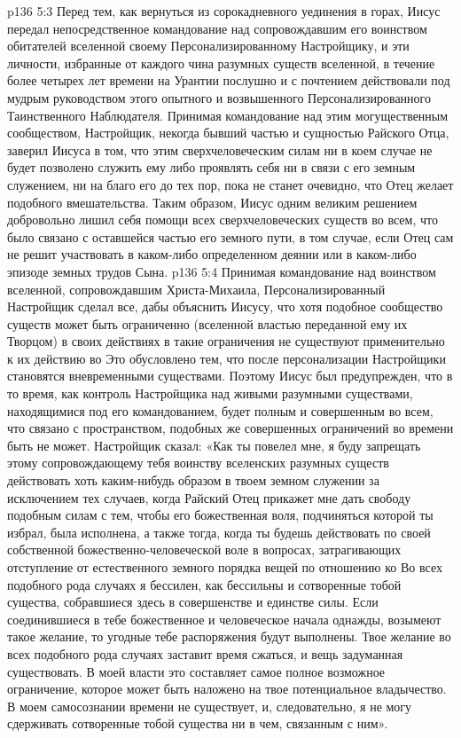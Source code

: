 \vs p136 5:3 \pc Перед тем, как вернуться из сорокадневного уединения в горах, Иисус передал непосредственное командование над сопровождавшим его воинством обитателей вселенной своему Персонализированному Настройщику, и эти личности, избранные от каждого чина разумных существ вселенной, в течение более четырех лет времени на Урантии послушно и с почтением действовали под мудрым руководством этого опытного и возвышенного Персонализированного Таинственного Наблюдателя. Принимая командование над этим могущественным сообществом, Настройщик, некогда бывший частью и сущностью Райского Отца, заверил Иисуса в том, что этим сверхчеловеческим силам ни в коем случае не будет позволено служить ему либо проявлять себя ни в связи с его земным служением, ни на благо его до тех пор, пока не станет очевидно, что Отец желает подобного вмешательства. Таким образом, Иисус одним великим решением добровольно лишил себя помощи всех сверхчеловеческих существ во всем, что было связано с оставшейся частью его земного пути, в том случае, если Отец сам не решит участвовать в каком\hyp{}либо определенном деянии или в каком\hyp{}либо эпизоде земных трудов Сына.
\vs p136 5:4 Принимая командование над воинством вселенной, сопровождавшим Христа\hyp{}Михаила, Персонализированный Настройщик сделал все, дабы объяснить Иисусу, что хотя подобное сообщество существ может быть ограниченно (вселенной властью переданной ему их Творцом) в своих действиях в  такие ограничения не существуют применительно к их действию во  Это обусловлено тем, что после персонализации Настройщики становятся вневременными существами. Поэтому Иисус был предупрежден, что в то время, как контроль Настройщика над живыми разумными существами, находящимися под его командованием, будет полным и совершенным во всем, что связано с пространством, подобных же совершенных ограничений во времени быть не может. Настройщик сказал: «Как ты повелел мне, я буду запрещать этому сопровождающему тебя воинству вселенских разумных существ действовать хоть каким\hyp{}нибудь образом в твоем земном служении за исключением тех случаев, когда Райский Отец прикажет мне дать свободу подобным силам с тем, чтобы его божественная воля, подчиняться которой ты избрал, была исполнена, а также тогда, когда ты будешь действовать по своей собственной божественно\hyp{}человеческой воле в вопросах, затрагивающих отступление от естественного земного порядка вещей по отношению ко  Во всех подобного рода случаях я бессилен, как бессильны и сотворенные тобой существа, собравшиеся здесь в совершенстве и единстве силы. Если соединившиеся в тебе божественное и человеческое начала однажды, возымеют такое желание, то угодные тебе распоряжения будут выполнены. Твое желание во всех подобного рода случаях заставит время сжаться, и вещь задуманная  существовать. В моей власти это составляет самое полное возможное ограничение, которое может быть наложено на твое потенциальное владычество. В моем самосознании времени не существует, и, следовательно, я не могу сдерживать сотворенные тобой существа ни в чем, связанным с ним».
